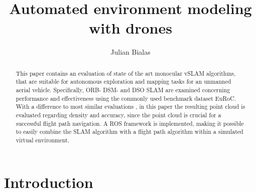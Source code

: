 \documentclass[runningheads]{llncs}
\begin{document}
%
\title{Automated environment modeling with drones}
%
%
\author{Julian Bialas}
%


\maketitle              %
%
\begin{abstract}

This paper contains an evaluation of state of the art monocular vSLAM algorithms, that are suitable for 
autonomous exploration and mapping tasks for an unmanned aerial vehicle. Specifically, ORB- DSM- and DSO SLAM are examined concerning performance and effectiveness using the commonly used benchmark dataset EuRoC. With a difference to most similar evaluations \cite{point_cloud_eval}, in this paper the resulting point cloud is evaluated regarding density and accuracy, since the point cloud is crucial for a successful flight path navigation. A ROS framework is implemented, making it possible to easily combine the SLAM algorithm with a flight path algorithm within a simulated virtual environment. 

\end{abstract}
%
%
%
\section{Introduction}
\end{document}
